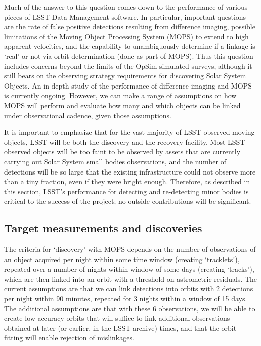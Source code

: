 Much of the answer to this question comes down to the performance of
various pieces of LSST Data Management software. In particular,
important questions are the
rate of false positive detections resulting from difference imaging, possible
limitations of the Moving Object Processing System (MOPS) to extend to high
apparent velocities, and the capability to unambiguously determine if
a linkage is `real' or not via orbit determination (done as part of
MOPS). Thus this question includes concerns beyond the limits of the OpSim simulated
surveys, although it still bears on the observing strategy requirements for
discovering Solar System Objects. An in-depth study of the performance
of difference imaging and MOPS is currently ongoing. However, we can
make a range of assumptions on how MOPS will perform and evaluate how
many and which objects can be linked under observational cadence, given those assumptions.

It is important to emphasize that for the vast majority of
LSST-observed moving objects, LSST will be both the discovery and the
recovery facility. Most LSST-observed objects will be too faint
to be observed by assets that are currently carrying out
Solar System small bodies observations, and the number of
detections will be so large that the existing infrastructure
could not observe more than a tiny fraction, even if they
were bright enough. Therefore, as described in this section,
LSST's performance for detecting and re-detecting minor
bodies is critical to the success of the project; no outside
contributions will be significant.



\subsection{Target measurements and discoveries}
\label{sec:\secname:targets}

The criteria for `discovery' with MOPS depends on the number
of observations of an object acquired per night within some time
window (creating `tracklets'), repeated over a number of nights within window of some
days (creating `tracks'), which are then linked into an orbit with a threshold on
astrometric residuals. The current assumptions are that we can link
detections into orbits with 2 detections per night within 90 minutes,
repeated for 3 nights within a window of 15 days. The additional assumptions are
that with these 6 observations, we will be able to create low-accuracy orbits that will suffice to link
additional observations obtained at later (or earlier, in the LSST
archive) times, and that the orbit fitting will enable rejection
of mislinkages.

